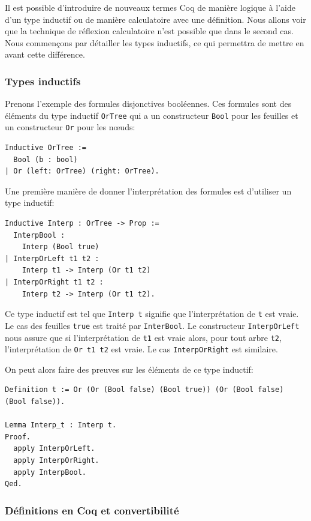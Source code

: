 \documentclass[11pt]{article}
\begin{document}
Il est possible d'introduire de nouveaux termes Coq de manière logique à l'aide d'un type  inductif ou de manière calculatoire avec une définition. Nous allons voir que la technique de réflexion calculatoire n'est possible que dans le second cas. Nous commençons par détailler les types inductifs, ce qui permettra de mettre en avant cette différence.

\subsubsection{Types inductifs}

Prenons l'exemple des formules disjonctives booléennes. Ces formules sont des éléments du type inductif \texttt{OrTree} qui a un constructeur \texttt{Bool} pour les feuilles et un constructeur \texttt{Or} pour les nœuds: 

\begin{lstlisting}[frame=single]
Inductive OrTree :=
  Bool (b : bool)
| Or (left: OrTree) (right: OrTree).
\end{lstlisting}

Une première manière de donner l'interprétation des formules est d'utiliser un type inductif:

\begin{lstlisting}[frame=single]
Inductive Interp : OrTree -> Prop :=
  InterpBool :
    Interp (Bool true) 
| InterpOrLeft t1 t2 :
    Interp t1 -> Interp (Or t1 t2) 
| InterpOrRight t1 t2 :
    Interp t2 -> Interp (Or t1 t2).
\end{lstlisting}

Ce type inductif est tel que \texttt{Interp t} signifie que l'interprétation de  \texttt{t} est vraie. Le cas des feuilles \texttt{true} est traité par \texttt{InterBool}. Le constructeur \texttt{InterpOrLeft} nous assure que si l'interprétation de \texttt{t1} est vraie alors, pour tout arbre \texttt{t2}, l'interprétation de \texttt{Or t1 t2} est vraie. Le cas \texttt{InterpOrRight} est similaire.\medbreak

On peut alors faire des preuves sur les éléments de ce type inductif: 
\begin{lstlisting}[frame=single]
Definition t := Or (Or (Bool false) (Bool true)) (Or (Bool false) (Bool false)).

Lemma Interp_t : Interp t.
Proof.
  apply InterpOrLeft.
  apply InterpOrRight.
  apply InterpBool.
Qed.
\end{lstlisting}

\subsubsection{Définitions en Coq et convertibilité}
\end{document}
